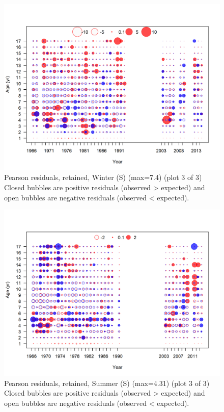 \documentclass[12pt,]{article}
\begin{document}
\begin{figure}
\centering
\includegraphics{r4ss/plots_mod1/comp_agefit_residsflt3mkt2_page3.png}
\caption{Pearson residuals, retained, Winter (S) (max=7.4) (plot 3 of
3)\\
Closed bubbles are positive residuals (observed \textgreater{} expected)
and open bubbles are negative residuals (observed \textless{} expected).
\label{fig:ws_age_pearson}}
\end{figure}

\begin{figure}
\centering
\includegraphics{r4ss/plots_mod1/comp_agefit_residsflt4mkt2_page3.png}
\caption{Pearson residuals, retained, Summer (S) (max=4.31) (plot 3 of
3)\\
Closed bubbles are positive residuals (observed \textgreater{} expected)
and open bubbles are negative residuals (observed \textless{} expected).
\label{fig:ss_age_pearson}}
\end{figure}
\end{document}
